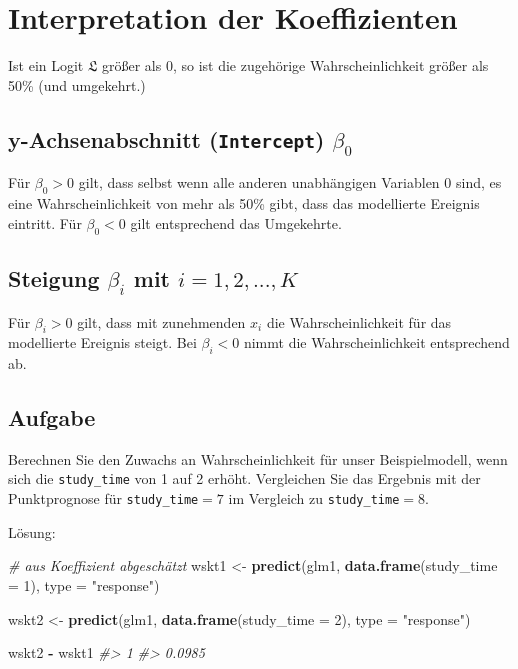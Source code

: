 \documentclass[12pt,ngerman,]{book}
\makeatletter
\newenvironment{Shaded}{\begin{snugshade}}{\end{snugshade}}
\newcommand{\KeywordTok}[1]{\textcolor[rgb]{0.13,0.29,0.53}{\textbf{#1}}}
\newcommand{\DataTypeTok}[1]{\textcolor[rgb]{0.13,0.29,0.53}{#1}}
\newcommand{\DecValTok}[1]{\textcolor[rgb]{0.00,0.00,0.81}{#1}}
\newcommand{\StringTok}[1]{\textcolor[rgb]{0.31,0.60,0.02}{#1}}
\newcommand{\CommentTok}[1]{\textcolor[rgb]{0.56,0.35,0.01}{\textit{#1}}}
\newcommand{\OperatorTok}[1]{\textcolor[rgb]{0.81,0.36,0.00}{\textbf{#1}}}
\newcommand{\NormalTok}[1]{#1}
\newenvironment{kframe}{%
\medskip{}
\setlength{\fboxsep}{.8em}
 \def\at@end@of@kframe{}%
 \ifinner\ifhmode%
  \def\at@end@of@kframe{\end{minipage}}%
  \begin{minipage}{\columnwidth}%
 \fi\fi%
 \def\FrameCommand##1{\hskip\@totalleftmargin \hskip-\fboxsep
 \colorbox{shadecolor}{##1}\hskip-\fboxsep
     \hskip-\linewidth \hskip-\@totalleftmargin \hskip\columnwidth}%
 \MakeFramed {\advance\hsize-\width
   \@totalleftmargin\z@ \linewidth\hsize
   \@setminipage}}%
 {\par\unskip\endMakeFramed%
 \at@end@of@kframe}
\renewenvironment{Shaded}{\begin{kframe}}{\end{kframe}}
\theoremstyle{definition}
\theoremstyle{definition}
\theoremstyle{remark}
\makeatother
\begin{document}
\section{Interpretation der
Koeffizienten}\label{interpretation-der-koeffizienten}

Ist ein Logit \(\mathfrak{L}\) größer als \(0\), so ist die zugehörige
Wahrscheinlichkeit größer als 50\% (und umgekehrt.)

\subsection{\texorpdfstring{y-Achsenabschnitt (\texttt{Intercept})
\(\beta_0\)}{y-Achsenabschnitt (Intercept) \textbackslash{}beta\_0}}\label{y-achsenabschnitt-intercept-beta_0}

Für \(\beta_0>0\) gilt, dass selbst wenn alle anderen unabhängigen
Variablen \(0\) sind, es eine Wahrscheinlichkeit von mehr als 50\% gibt,
dass das modellierte Ereignis eintritt. Für \(\beta_0<0\) gilt
entsprechend das Umgekehrte.

\subsection{\texorpdfstring{Steigung \(\beta_i\) mit
\(i=1,2,...,K\)}{Steigung \textbackslash{}beta\_i mit i=1,2,...,K}}\label{steigung-beta_i-mit-i12...k}

Für \(\beta_i>0\) gilt, dass mit zunehmenden \(x_i\) die
Wahrscheinlichkeit für das modellierte Ereignis steigt. Bei
\(\beta_i<0\) nimmt die Wahrscheinlichkeit entsprechend ab.

\subsection{Aufgabe}\label{aufgabe}

Berechnen Sie den Zuwachs an Wahrscheinlichkeit für unser
Beispielmodell, wenn sich die \texttt{study\_time} von 1 auf 2 erhöht.
Vergleichen Sie das Ergebnis mit der Punktprognose für
\texttt{study\_time}\(=7\) im Vergleich zu \texttt{study\_time}\(=8\).

Lösung:

\begin{Shaded}
\begin{Highlighting}[]
\CommentTok{# aus Koeffizient abgeschätzt}
\NormalTok{wskt1 <-}\StringTok{ }\KeywordTok{predict}\NormalTok{(glm1, }\KeywordTok{data.frame}\NormalTok{(}\DataTypeTok{study_time =} \DecValTok{1}\NormalTok{), }\DataTypeTok{type =} \StringTok{"response"}\NormalTok{)}

\NormalTok{wskt2 <-}\StringTok{ }\KeywordTok{predict}\NormalTok{(glm1, }\KeywordTok{data.frame}\NormalTok{(}\DataTypeTok{study_time =} \DecValTok{2}\NormalTok{), }\DataTypeTok{type =} \StringTok{"response"}\NormalTok{)}

\NormalTok{wskt2 }\OperatorTok{-}\StringTok{ }\NormalTok{wskt1}
\CommentTok{#>      1 }
\CommentTok{#> 0.0985}
\end{Highlighting}
\end{Shaded}
\end{document}
